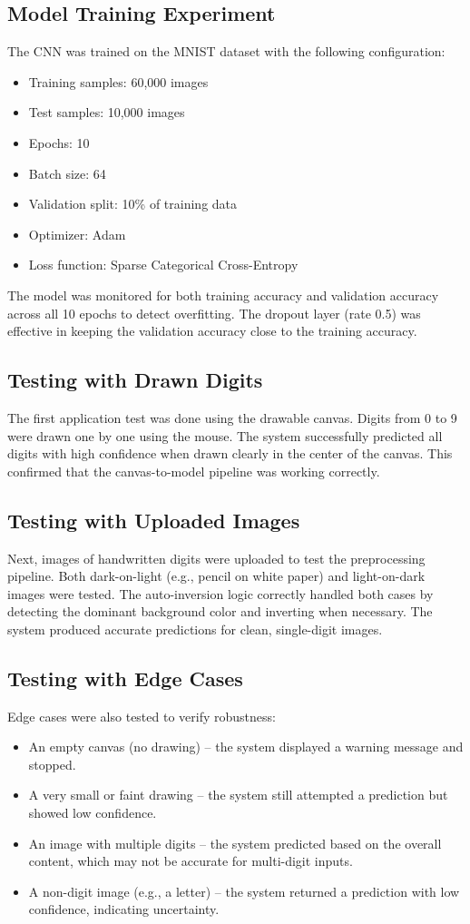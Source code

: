 \documentclass[12pt,a4paper]{report}
\begin{document}
\subsection{Model Training Experiment}
The CNN was trained on the MNIST dataset with the following configuration:
\begin{itemize}
    \item Training samples: 60,000 images
    \item Test samples: 10,000 images
    \item Epochs: 10
    \item Batch size: 64
    \item Validation split: 10\% of training data
    \item Optimizer: Adam
    \item Loss function: Sparse Categorical Cross-Entropy
\end{itemize}
The model was monitored for both training accuracy and validation accuracy across all 10 epochs to detect overfitting. The dropout layer (rate 0.5) was effective in keeping the validation accuracy close to the training accuracy.

\subsection{Testing with Drawn Digits}
The first application test was done using the drawable canvas. Digits from 0 to 9 were drawn one by one using the mouse. The system successfully predicted all digits with high confidence when drawn clearly in the center of the canvas. This confirmed that the canvas-to-model pipeline was working correctly.

\subsection{Testing with Uploaded Images}
Next, images of handwritten digits were uploaded to test the preprocessing pipeline. Both dark-on-light (e.g., pencil on white paper) and light-on-dark images were tested. The auto-inversion logic correctly handled both cases by detecting the dominant background color and inverting when necessary. The system produced accurate predictions for clean, single-digit images.

\subsection{Testing with Edge Cases}
Edge cases were also tested to verify robustness:
\begin{itemize}
    \item An empty canvas (no drawing) -- the system displayed a warning message and stopped.
    \item A very small or faint drawing -- the system still attempted a prediction but showed low confidence.
    \item An image with multiple digits -- the system predicted based on the overall content, which may not be accurate for multi-digit inputs.
    \item A non-digit image (e.g., a letter) -- the system returned a prediction with low confidence, indicating uncertainty.
\end{itemize}
\end{document}
